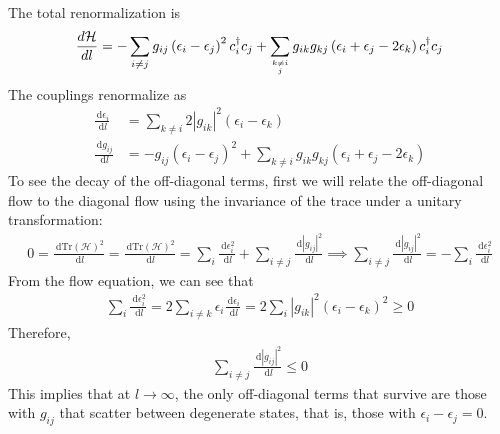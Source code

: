 \documentclass[twoside,11pt]{report}
\numberwithin{equation}{section}
\begin{document}
The total renormalization is
\begin{equation}
	\frac{d\mathcal{H}}{dl} = -\sum_{i\neq j} g_{ij}\left(\epsilon_i - \epsilon_j\right)^2 c^\dagger_i c_j + \sum_{k\neq i\atop{j}}g_{ik}g_{kj}\left( \epsilon_i + \epsilon_j - 2\epsilon_k \right) c^\dagger_i c_j
\end{equation}
The couplings renormalize as
\begin{equation}\begin{aligned}
	\frac{\:\mathrm{d}\epsilon_i}{\:\mathrm{d}l} &= \sum_{k \neq i} 2|g_{ik}|^2\left( \epsilon_i - \epsilon_k \right)\\
	\frac{\:\mathrm{d}g_{ij}}{\:\mathrm{d}l} &= - g_{ij}\left(\epsilon_i - \epsilon_j\right)^2 + \sum_{k \neq i}g_{ik}g_{kj}\left( \epsilon_i + \epsilon_j - 2\epsilon_k \right)
\end{aligned}\end{equation}
To see the decay of the off-diagonal terms, first we will relate the off-diagonal flow to the diagonal flow using the invariance of the trace under a unitary transformation:
\begin{equation}\begin{aligned}
	0 = \frac{\:\mathrm{d}\text{Tr}\left( \mathcal{H} \right) ^2}{\:\mathrm{d}l} = \frac{\:\mathrm{d}\text{Tr}\left( \mathcal{H} \right) ^2}{\:\mathrm{d}l} = \sum_i \frac{\:\mathrm{d} \epsilon_i^2 }{\:\mathrm{d}l} + \sum_{i\neq j}\frac{\:\mathrm{d}|g_{ij}|^2}{\:\mathrm{d}l} \implies \sum_{i\neq j}\frac{\:\mathrm{d}|g_{ij}|^2}{\:\mathrm{d}l} = -\sum_i \frac{\:\mathrm{d} \epsilon_i^2 }{\:\mathrm{d}l}
\end{aligned}\end{equation}
From the flow equation, we can see that
\begin{equation}\begin{aligned}
	\sum_i \frac{\:\mathrm{d} \epsilon_i^2 }{\:\mathrm{d}l} = 2\sum_{i \neq k} \epsilon_i \frac{\:\mathrm{d} \epsilon_i }{\:\mathrm{d}l} = 2 \sum_i |g_{ik}|^2 \left( \epsilon_i - \epsilon_k \right) ^2 \geq 0
\end{aligned}\end{equation}
Therefore,
\begin{equation}\begin{aligned}
	\sum_{i\neq j}\frac{\:\mathrm{d}|g_{ij}|^2}{\:\mathrm{d}l} \leq 0
\end{aligned}\end{equation}
This implies that at \(l \to \infty\), the only off-diagonal terms that survive are those with \(g_{ij}\) that scatter between degenerate states, that is, those with \(\epsilon_i - \epsilon_j = 0\).
\end{document}
